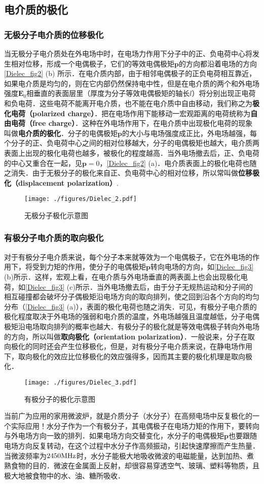 \subsection{电介质的极化}

\subsubsection{无极分子电介质的位移极化}

当无极分子电介质处在外电场中时，在电场力作用下分子中的正、负电荷中心将发生相对位移，形成一个电偶极子，它们的等效电偶极矩$\mathbf p$的方向都沿着电场的方向\autoref{Dielec_fig2} (b) 所示．在电介质内部，由于相邻电偶极子的正负电荷相互靠近，如果电介质是均匀的，则在它内部仍然保持电中性，但是在电介质的两个和外电场强度$\mathbf E_0$相垂直的表面层里（厚度为分子等效电偶极矩的轴长$l$）将分别出现正电荷和负电荷．这些电荷不能离开电介质，也不能在电介质中自由移动，我们称之为\textbf{极化电荷（polarized charge）}．把在电场作用下能移动一宏观距离的电荷统称为\textbf{自由电荷（free charge）}．这种在外电场作用下，在电介质中出现极化电荷的现象叫做\textbf{电介质的极化}．分子的电偶极矩$\mathbf p $的大小与电场强度成正比，外电场越强，每个分子的正、负电荷中心之间的相对位移越大，分子的电偶极矩也越大，电介质两表面上出现的极化电荷也越多，被极化的程度越高．当外电场撤去后，正、负电荷的中心又重合在一起，见$\mathbf p=0$，\autoref{Dielec_fig2} (a)．电介质表面上的极化电荷也随之消失．由于无极分子的极化来自正、负电荷中心的相对位移，所以常叫做\textbf{位移极化（displacement polarization）}.
\begin{figure}[ht]
\centering
\texttt{[image: ./figures/Dielec\_2.pdf]}
\caption{无极分子极化示意图} \label{Dielec_fig2}
\end{figure}

\subsubsection{有极分子电介质的取向极化}

对于有极分子电介质来说，每个分子本来就等效为一个电偶极子，它在外电场的作用下，将受到力矩的作用，使分子的电偶极矩$\mathbf p$转向电场的方向，如\autoref{Dielec_fig3} (b)所示．这样，宏观上看，在电介质与外电场垂直的两表面上也会出现极化电荷，如\autoref{Dielec_fig3} (c)所示．当外电场撤去后，由于分子无规热运动和分子间的相互碰撞都会破坏分子偶极矩沿电场方向的取向排列，使之回到沿各个方向的均匀分布（\autoref{Dielec_fig3} (a)），表面的极化电荷也随之消失．可见，有极分子电介质的极化程度取决于外电场的强弱和电介质的温度，外电场越强且温度越低，分子电偶极矩沿电场取向排列的概率也越大．有极分子的极化就是等效电偶极子转向外电场的方向，所以叫做\textbf{取向极化（orientation polarization）}．一般说来，分子在取向极化的同时还会产生位移极化，但是，对有极分子电介质来说，在静电场作用下，取向极化的效应比位移极化的效应强得多，因而其主要的极化机理是取向极化．
\begin{figure}[ht]
\centering
\texttt{[image: ./figures/Dielec\_3.pdf]}
\caption{有极分子的极化示意图} \label{Dielec_fig3}
\end{figure}

当前广为应用的家用微波炉，就是介质分子（水分子）在高频电场中反复极化的一个实际应用！水分子作为一个有极分子，其电偶极子在电场力矩的作用下，要转向与外电场方向一致的排列．如果电场方向交替变化，水分子的电偶极矩$\mathbf p$也要跟随电场方向反复转动，在这个过程中水分子作高频振动，引起快速摩擦而产生热量．当微波频率为$2450\rm  MHz$时，水分子能极大地吸收微波的电磁能量，达到加热、煮熟食物的目的．微波在金属面上反射，却很容易穿透空气、玻璃、塑料等物质，且极大地被食物中的水、油、糖所吸收．
